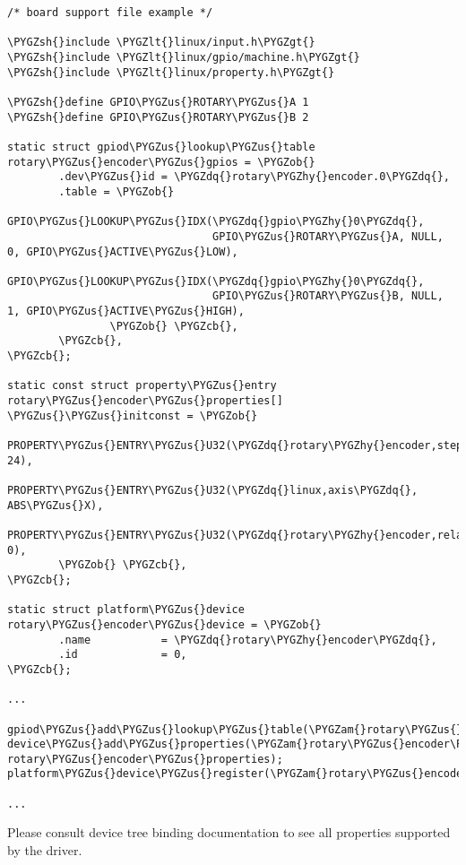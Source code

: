 \documentclass[a4paper,8pt,english]{sphinxmanual}
\def\PYGZus{\char`\_}
\def\PYGZob{\char`\{}
\def\PYGZcb{\char`\}}
\def\PYGZam{\char`\&}
\def\PYGZlt{\char`\<}
\def\PYGZgt{\char`\>}
\def\PYGZsh{\char`\#}
\def\PYGZhy{\char`\-}
\def\PYGZdq{\char`\"}
\begin{document}
\begin{Verbatim}[commandchars=\\\{\}]
/* board support file example */

\PYGZsh{}include \PYGZlt{}linux/input.h\PYGZgt{}
\PYGZsh{}include \PYGZlt{}linux/gpio/machine.h\PYGZgt{}
\PYGZsh{}include \PYGZlt{}linux/property.h\PYGZgt{}

\PYGZsh{}define GPIO\PYGZus{}ROTARY\PYGZus{}A 1
\PYGZsh{}define GPIO\PYGZus{}ROTARY\PYGZus{}B 2

static struct gpiod\PYGZus{}lookup\PYGZus{}table rotary\PYGZus{}encoder\PYGZus{}gpios = \PYGZob{}
        .dev\PYGZus{}id = \PYGZdq{}rotary\PYGZhy{}encoder.0\PYGZdq{},
        .table = \PYGZob{}
                GPIO\PYGZus{}LOOKUP\PYGZus{}IDX(\PYGZdq{}gpio\PYGZhy{}0\PYGZdq{},
                                GPIO\PYGZus{}ROTARY\PYGZus{}A, NULL, 0, GPIO\PYGZus{}ACTIVE\PYGZus{}LOW),
                GPIO\PYGZus{}LOOKUP\PYGZus{}IDX(\PYGZdq{}gpio\PYGZhy{}0\PYGZdq{},
                                GPIO\PYGZus{}ROTARY\PYGZus{}B, NULL, 1, GPIO\PYGZus{}ACTIVE\PYGZus{}HIGH),
                \PYGZob{} \PYGZcb{},
        \PYGZcb{},
\PYGZcb{};

static const struct property\PYGZus{}entry rotary\PYGZus{}encoder\PYGZus{}properties[] \PYGZus{}\PYGZus{}initconst = \PYGZob{}
        PROPERTY\PYGZus{}ENTRY\PYGZus{}U32(\PYGZdq{}rotary\PYGZhy{}encoder,steps\PYGZhy{}per\PYGZhy{}period\PYGZdq{}, 24),
        PROPERTY\PYGZus{}ENTRY\PYGZus{}U32(\PYGZdq{}linux,axis\PYGZdq{},                      ABS\PYGZus{}X),
        PROPERTY\PYGZus{}ENTRY\PYGZus{}U32(\PYGZdq{}rotary\PYGZhy{}encoder,relative\PYGZus{}axis\PYGZdq{},    0),
        \PYGZob{} \PYGZcb{},
\PYGZcb{};

static struct platform\PYGZus{}device rotary\PYGZus{}encoder\PYGZus{}device = \PYGZob{}
        .name           = \PYGZdq{}rotary\PYGZhy{}encoder\PYGZdq{},
        .id             = 0,
\PYGZcb{};

...

gpiod\PYGZus{}add\PYGZus{}lookup\PYGZus{}table(\PYGZam{}rotary\PYGZus{}encoder\PYGZus{}gpios);
device\PYGZus{}add\PYGZus{}properties(\PYGZam{}rotary\PYGZus{}encoder\PYGZus{}device, rotary\PYGZus{}encoder\PYGZus{}properties);
platform\PYGZus{}device\PYGZus{}register(\PYGZam{}rotary\PYGZus{}encoder\PYGZus{}device);

...
\end{Verbatim}

Please consult device tree binding documentation to see all properties
supported by the driver.
\end{document}
